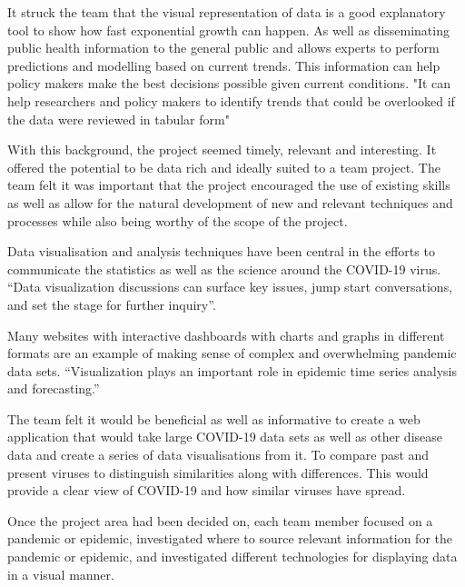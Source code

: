 It struck the team that the visual representation of data is a good explanatory tool to show how fast exponential growth can happen. As well as disseminating public health information to the general public and allows experts to perform predictions and modelling based on current trends. This information can help policy makers make the best decisions possible given current conditions.
\vspace{2mm}
"It can help researchers and policy makers to identify trends that could be overlooked if the data were reviewed in tabular form" \cite{tebe2020covid19}

With this background, the project seemed timely, relevant and interesting.
It offered the potential to be data rich and ideally suited to a team project. The team felt it was important that the project encouraged the use of existing skills as well as allow for the natural development of new and relevant techniques and processes while also being worthy of the scope of the project.

\vspace{5mm} %

Data visualisation and analysis techniques have been central in the efforts to communicate the statistics as well as the science around the COVID-19 virus. 
“Data visualization discussions can surface key issues, jump start conversations, and set the stage for further inquiry”.\cite{fontichiaro2021using}

Many websites with interactive dashboards with charts and graphs in different formats are an example of making sense of complex and overwhelming pandemic data sets. 
“Visualization plays an important role in epidemic time series analysis and forecasting.”\cite{thorve2018epiviewer}



\vspace{5mm} %

The team felt it would be beneficial as well as informative to create a web application that would take large COVID-19 data sets as well as other disease data and create a series of data visualisations from it. To compare past and present viruses to distinguish similarities along with differences. This would provide a clear view of COVID-19 and how similar viruses have spread.

\vspace{3mm} %
Once the project area had been decided on, each team member focused on a pandemic or epidemic, investigated where to source relevant information for the pandemic or epidemic, and investigated different technologies for displaying data in a visual manner.

